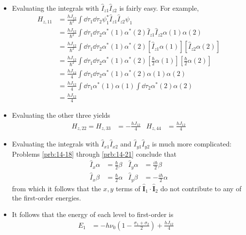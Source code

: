 \documentclass[../notes.tex]{subfiles}
\begin{document}
\begin{itemize}
\begin{itemize}
        \item Evaluating the integrals with $\hat{I}_{z1}\hat{I}_{z2}$ is fairly easy. For example,
        \begin{align*}
            H_{z,11} &= \frac{hJ_{12}}{\hbar^2}\int\dd{\tau_1}\dd{\tau_2}\psi_1^*\hat{I}_{z1}\hat{I}_{z2}\psi_1\\
            &= \frac{hJ_{12}}{\hbar^2}\int\dd{\tau_1}\dd{\tau_2}\alpha^*(1)\alpha^*(2)\hat{I}_{z1}\hat{I}_{z2}\alpha(1)\alpha(2)\\
            &= \frac{hJ_{12}}{\hbar^2}\int\dd{\tau_1}\dd{\tau_2}\alpha^*(1)\alpha^*(2)[\hat{I}_{z1}\alpha(1)][\hat{I}_{z2}\alpha(2)]\\
            &= \frac{hJ_{12}}{\hbar^2}\int\dd{\tau_1}\dd{\tau_2}\alpha^*(1)\alpha^*(2)[\tfrac{\hbar}{2}\alpha(1)][\tfrac{\hbar}{2}\alpha(2)]\\
            &= \frac{hJ_{12}}{4}\int\dd{\tau_1}\dd{\tau_2}\alpha^*(1)\alpha^*(2)\alpha(1)\alpha(2)\\
            &= \frac{hJ_{12}}{4}\int\dd{\tau_1}\alpha^*(1)\alpha(1)\int\dd{\tau_2}\alpha^*(2)\alpha(2)\\
            &= \frac{hJ_{12}}{4}
        \end{align*}
        \item {}Evaluating the other three yields
        \begin{align*}
            H_{z,22} = H_{z,33} &= -\frac{hJ_{12}}{4}&
            H_{z,44} &= \frac{hJ_{12}}{4}
        \end{align*}
        \item Evaluating the integrals with $\hat{I}_{x1}\hat{I}_{x2}$ and $\hat{I}_{y1}\hat{I}_{y2}$ is much more complicated: Problems \ref{prb:14-18} through \ref{prb:14-21} conclude that
        \begin{align*}
            \hat{I}_x\alpha &= \frac{\hbar}{2}\beta&
            \hat{I}_y\alpha &= \frac{i\hbar}{2}\beta\\
            \hat{I}_x\beta &= \frac{\hbar}{2}\alpha&
            \hat{I}_y\beta &= -\frac{i\hbar}{2}\alpha
        \end{align*}
        from which it follows that the $x,y$ terms of $\hat{\mathbf{I}}_1\cdot\hat{\mathbf{I}}_2$ do not contribute to any of the first-order energies.
        \item It follows that the energy of each level to first-order is
        \begin{align*}
            E_1 &= -h\nu_0\left( 1-\frac{\sigma_1+\sigma_2}{2} \right)+\frac{hJ_{12}}{4}&

\end{align*}
\end{itemize}
\end{itemize}
\end{document}
